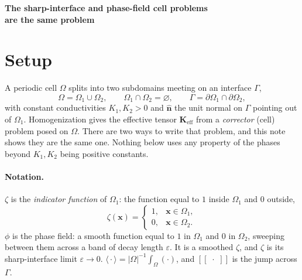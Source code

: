 \documentclass[11pt]{article}
\newcommand{\Om}{\Omega}
\newcommand{\Gam}{\Gamma}
\newcommand{\bn}{\hat{\mathbf n}}
\newcommand{\Keff}{\mathbf{K}_{\mathrm{eff}}}
\newcommand{\jump}[1]{[\![\,#1\,]\!]}
\newcommand{\avg}[1]{\big\langle #1 \big\rangle}
\newcommand{\ind}{\zeta}  %
\begin{document}
\begin{center}
{\large\bfseries The sharp-interface and phase-field cell problems\\[2pt]
are the same problem}
\end{center}

\section{Setup}

A periodic cell $\Om$ splits into two subdomains meeting on an interface $\Gam$,
\[
\Om=\Om_1\cup\Om_2,\qquad \Om_1\cap\Om_2=\varnothing,\qquad
\Gam=\partial\Om_1\cap\partial\Om_2,
\]
with constant conductivities $K_1,K_2>0$ and $\bn$ the unit normal on $\Gam$
pointing out of $\Om_1$. Homogenization gives the effective tensor $\Keff$ from
a \emph{corrector} (cell) problem posed on $\Om$. There are two ways to write
that problem, and this note shows they are the same one. Nothing below uses any
property of the phases beyond $K_1,K_2$ being positive constants.

\paragraph{Notation.}
$\ind$ is the \emph{indicator function} of $\Om_1$: the function equal to $1$
inside $\Om_1$ and $0$ outside,
\begin{equation}
\ind(\mathbf x)=
\begin{cases} 1, & \mathbf x\in\Om_1,\\ 0, & \mathbf x\in\Om_2.\end{cases}
\label{eq:ind}
\end{equation}
$\phi$ is the phase field: a smooth function equal to $1$ in $\Om_1$ and $0$
in $\Om_2$, sweeping between them across a band of decay length $\varepsilon$.
It is a smoothed $\ind$, and $\ind$ is its sharp-interface limit $\varepsilon\to0$. $\avg{\cdot}=|\Om|^{-1}\!\int_\Om(\cdot)$, and
$\jump{\,\cdot\,}$ is the jump across $\Gam$.
\end{document}
